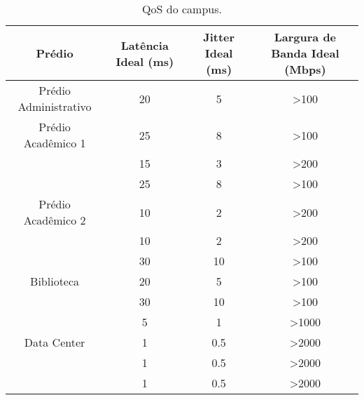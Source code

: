 \begin{table}[H]
\centering
\begin{tabular}{cccc}
\toprule
Prédio                  & Latência Ideal (ms) & Jitter Ideal (ms) & Largura de Banda Ideal (Mbps) \\
\midrule
Prédio Administrativo  & 20                 & 5               & >100                         \\
Prédio Acadêmico 1     & 25                 & 8               & >100                         \\
                       & 15                 & 3               & >200                         \\
                       & 25                 & 8               & >100                         \\
Prédio Acadêmico 2     & 10                 & 2               & >200                         \\
                          & 10                 & 2               & >200                         \\
                          & 30                 & 10               & >100                         \\
Biblioteca             & 20                 & 5               & >100                         \\
                            & 30                 & 10               & >100                         \\
                            & 5                 & 1               & >1000                        \\
Data Center            & 1                 & 0.5             & >2000                        \\
                            & 1                 & 0.5             & >2000                        \\
                            & 1                 & 0.5             & >2000                        \\
\bottomrule
\end{tabular}
\caption{QoS do campus.}
\label{tab:qos}
\end{table}


